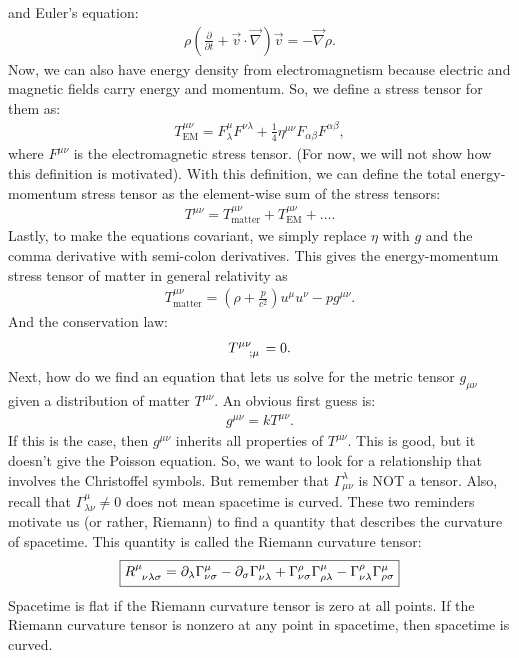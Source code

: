 \documentclass{book}
\theoremstyle{definition}
\begin{document}
and Euler's equation:
\begin{align*}
\rho\left( \frac{\partial}{\partial t } + \vec{v}\cdot\vec{\nabla}\right)\vec{v} = -\vec{\nabla}\rho. 
\end{align*}
Now, we can also have energy density from electromagnetism because electric and magnetic fields carry energy and momentum. So, we define a stress tensor for them as:
\begin{align*}
\boxed{T^{\mu\nu}_{\text{EM}} = F^{\mu}_{\lambda}F^{\nu\lambda} + \frac{1}{4}\eta^{\mu\nu}F_{\alpha\beta}F^{\alpha\beta} },
\end{align*}
where $F^{\mu\nu}$ is the electromagnetic stress tensor. (For now, we will not show how this definition is motivated). With this definition, we can define the total energy-momentum stress tensor as the element-wise sum of the stress tensors:
\begin{align*}
T^{\mu\nu} = T^{\mu\nu}_{\text{matter}} + T^{\mu\nu}_{\text{EM}} + \dots.
\end{align*}
Lastly, to make the equations covariant, we simply replace $\eta$ with $g$ and the comma derivative with semi-colon derivatives. This gives the energy-momentum stress tensor of matter in general relativity as
\begin{align*}
T^{\mu\nu}_{\text{matter}} = \left(\rho + \frac{p}{c^2} \right)u^\mu u^\nu  - pg^{\mu\nu}.
\end{align*}
And the conservation law:
\begin{align*}
\tensor{T}{^{\mu\nu}_{;\mu}} = 0.
\end{align*}
Next, how do we find an equation that lets us solve for the metric tensor $g_{\mu\nu}$ given a distribution of matter $T^{\mu\nu}$. An obvious first guess is:
\begin{align*}
g^{\mu\nu} = kT^{\mu\nu}.
\end{align*}
If this is the case, then $g^{\mu\nu}$ inherits all properties of $T^{\mu\nu}$. This is good, but it doesn't give the Poisson equation. So, we want to look for a relationship that involves the Christoffel symbols. But remember that $\Gamma^{\lambda}_{\mu\nu}$ is NOT a tensor. Also, recall that $\Gamma^{\mu}_{\lambda\nu} \neq 0$ does not mean spacetime is curved. These two reminders motivate us (or rather, Riemann) to find a quantity that describes the curvature of spacetime. This quantity is called the Riemann curvature tensor:
\begin{align*}
\boxed{\tensor{R}{^{\mu}_{\nu\lambda\sigma}} = \partial_\lambda \Gamma^{\mu}_{\nu\sigma} - \partial_\sigma \Gamma^{\mu}_{\nu\lambda} + \Gamma^{\rho}_{\nu\sigma}\Gamma^{\mu}_{\rho\lambda} - \Gamma^{\rho}_{\nu\lambda}\Gamma^{\mu}_{\rho\sigma}}
\end{align*}  
Spacetime is flat if the Riemann curvature tensor is zero at all points. If the Riemann curvature tensor is nonzero at any point in spacetime, then spacetime is curved.
\end{document}
